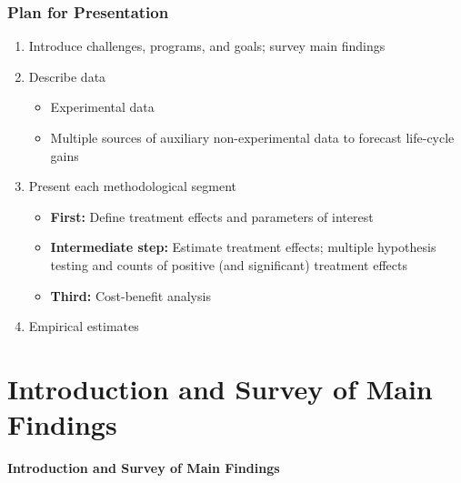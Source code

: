 \documentclass[static]{JJH-Beamer}
\begin{document}
\begin{frame}
\frametitle{Plan for Presentation}

\begin{enumerate}
	\item Introduce challenges, programs, and goals; survey main findings
	\item Describe data 
		\begin{itemize}
			\item Experimental data
			\item Multiple sources of auxiliary non-experimental data to forecast life-cycle gains
		\end{itemize}
	\item Present each methodological segment
		\begin{itemize}
			\item \textbf{First:} Define treatment effects and parameters of interest \\ 
			\item \textbf{Intermediate step:} Estimate treatment effects; multiple hypothesis testing and counts of positive (and significant) treatment effects \\
			\item \textbf{Third:} Cost-benefit analysis \\
		\end{itemize}
	\item Empirical estimates
\end{enumerate}
\end{frame}


\section{Introduction and Survey of Main Findings}

\begin{frame}[noframenumbering]

\begin{block}{}
\begin{center}
\textbf{Introduction and Survey of Main Findings}
\end{center}
\end{block}

\end{frame}

\end{document}
